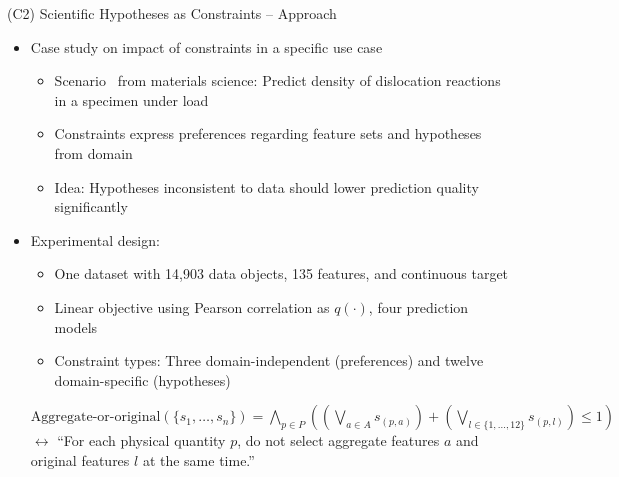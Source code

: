 \documentclass[en, navbarinline, handout]{sdqbeamer}
\begin{document}
\begin{frame}[t]{(C2) Scientific Hypotheses as Constraints -- Approach}
	\begin{itemize}
		\item Case study on impact of constraints in a specific use case
		\begin{itemize}
			\item Scenario~\cite{sudmanns2020data} from materials science: Predict density of dislocation reactions in a specimen under load
			\item Constraints express preferences regarding feature sets and hypotheses from domain
			\item Idea: Hypotheses inconsistent to data should lower prediction quality significantly
		\end{itemize}
		\vspace{\baselineskip}
		\item Experimental design:
		\begin{itemize}
			\item One dataset with 14,903 data objects, 135 features, and continuous target
			\item Linear objective using Pearson correlation as $q(\cdot)$, four prediction models
			\item Constraint types: Three domain-independent (preferences) and twelve domain-specific (hypotheses)
		\end{itemize}
		\vspace{\baselineskip}
		\begin{example}
			$\text{Aggregate-or-original}(\{s_1, \dots, s_n\}) = \bigwedge_{p \in P} \left( \left( \bigvee_{a \in A} s_{(p,a)} \right) + \left( \bigvee_{l \in \{1, \dots, 12\}} s_{(p,l)} \right) \leq 1 \right)$\\
			$\leftrightarrow$ ``For each physical quantity $p$, do not select aggregate features $a$ and original features $l$ at the same time.'' %
		\end{example}
	\end{itemize}
\end{frame}
\end{document}
